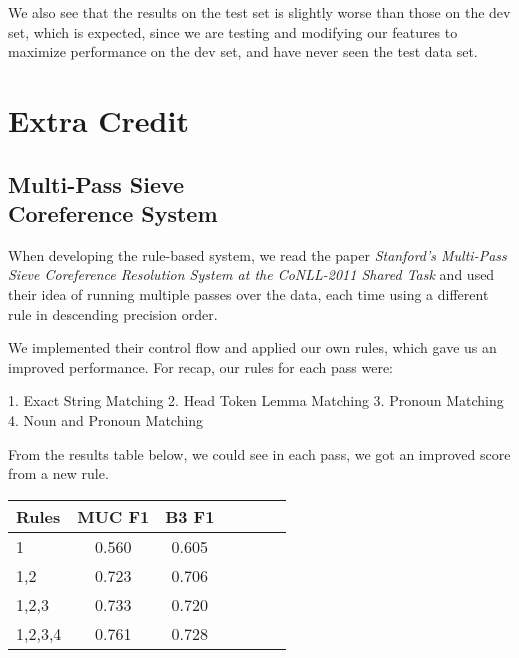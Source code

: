 \documentclass[12pt, twocolumn]{article}
\begin{document}
We also see that the results on the test set is slightly worse than those on the dev set, which is expected, since we are testing and modifying our features to maximize performance on the dev set, and have never seen the test data set.

\section{Extra Credit}
\subsection{Multi-Pass Sieve \\Coreference System}
When developing the rule-based system, we read the paper 
\textit{Stanford’s Multi-Pass Sieve Coreference Resolution System at the CoNLL-2011 Shared Task} and used their idea of running multiple passes over the data, each time using a different rule in descending precision order.

We implemented their control flow and applied our own rules, which gave us an improved performance. For recap, our rules for each pass were:

1. Exact String Matching
2. Head Token Lemma Matching
3. Pronoun Matching
4. Noun and Pronoun Matching

From the results table below, we could see in each pass, we got an improved score from a new rule.


\begin{tabular}{l|c c c|c c c}
	\hline
	Rules & MUC F1 & B3 F1\\\hline
	1 & 0.560 & 0.605 \\\hline
	1,2 & 0.723 & 0.706 \\\hline
	1,2,3 & 0.733 & 0.720 \\\hline
	1,2,3,4 & 0.761 & 0.728\\\hline
\end{tabular}
\end{document}
